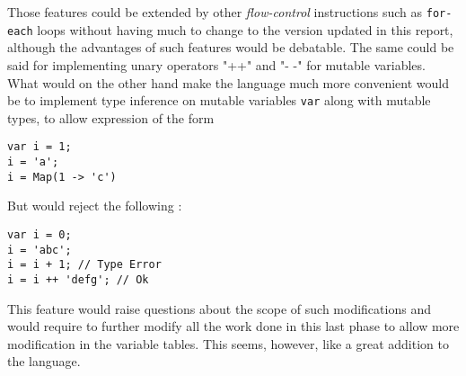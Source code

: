 Those features could be extended by other \textit{flow-control} instructions such as \texttt{for-each} loops without having much to change to the version updated in this report, although the advantages of such features would be debatable. The same could be said for implementing unary operators "++" and "- -" for mutable variables.\\

What would on the other hand make the language much more convenient would be to implement type inference on mutable variables \texttt{var} along with mutable types, to allow expression of the form 
\begin{lstlisting}
var i = 1;         
i = 'a';          
i = Map(1 -> 'c') 
\end{lstlisting}
But would reject the following :
\begin{lstlisting}
var i = 0;
i = 'abc';
i = i + 1; // Type Error
i = i ++ 'defg'; // Ok
\end{lstlisting}

This feature would raise questions about the scope of such modifications and would require to further modify all the work done in this last phase to allow more modification in the variable tables. This seems, however, like a great addition to the language.
